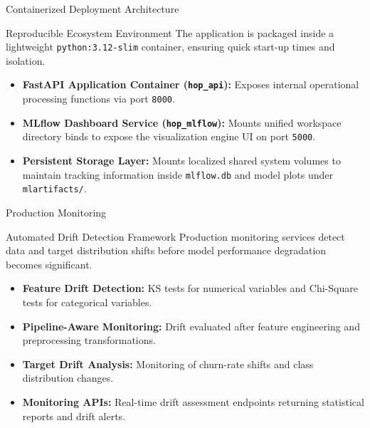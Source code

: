 \begin{frame}{Containerized Deployment Architecture}
    \begin{block}{Reproducible Ecosystem Environment}
        The application is packaged inside a lightweight \texttt{python:3.12-slim} container, ensuring quick start-up times and isolation.
    \end{block}
    \begin{itemize}
        \item \textbf{FastAPI Application Container (\texttt{hop\_api}):} Exposes internal operational processing functions via port \texttt{8000}.
        \item \textbf{MLflow Dashboard Service (\texttt{hop\_mlflow}):} Mounts unified workspace directory binds to expose the visualization engine UI on port \texttt{5000}.
        \item \textbf{Persistent Storage Layer:} Mounts localized shared system volumes to maintain tracking information inside \texttt{mlflow.db} and model plots under \texttt{mlartifacts/}.
    \end{itemize}
\end{frame}

\begin{frame}{Production Monitoring}
    \begin{block}{Automated Drift Detection Framework}
        Production monitoring services detect data and target distribution shifts before model performance degradation becomes significant.
    \end{block}

    \begin{itemize}
        \item \textbf{Feature Drift Detection:} KS tests for numerical variables and Chi-Square tests for categorical variables.
        \item \textbf{Pipeline-Aware Monitoring:} Drift evaluated after feature engineering and preprocessing transformations.
        \item \textbf{Target Drift Analysis:} Monitoring of churn-rate shifts and class distribution changes.
        \item \textbf{Monitoring APIs:} Real-time drift assessment endpoints returning statistical reports and drift alerts.
    \end{itemize}
\end{frame}

